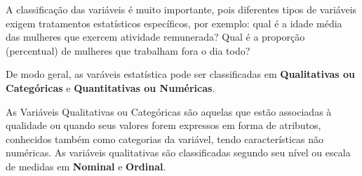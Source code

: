\inic A classificação das variáveis é muito importante, pois diferentes tipos de variáveis exigem tratamentos estatísticos específicos, por exemplo: qual é a idade média das mulheres
que exercem atividade remunerada? Qual é a proporção (percentual) de mulheres que trabalham fora o dia todo?
\vskip0.3cm



\inic De modo geral, as varáveis estatística pode ser classificadas em \textbf{Qualitativas ou Categóricas} e \textbf{Quantitativas ou Numéricas}.\vskip0.3cm

\inic As Variáveis Qualitativas ou Categóricas são aquelas que estão associadas à qualidade ou quando seus valores forem expressos em forma de atributos, conhecidos também como categorias da variável, tendo características não numéricas. As variáveis qualitativas são classificadas segundo seu nível ou escala de medidas em \textbf{Nominal} e \textbf{Ordinal}.\vskip0.3cm


